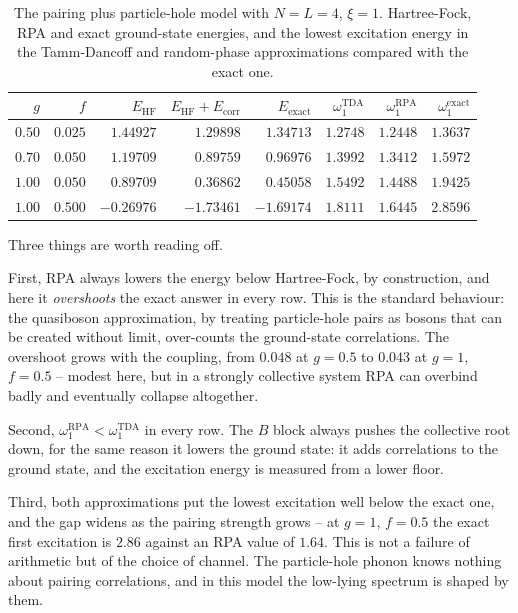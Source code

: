 \begin{table}[h]
\centering
\renewcommand{\arraystretch}{1.25}
\setlength{\tabcolsep}{7pt}
\begin{tabular}{rrrrrrrr}
\toprule
$g$ & $f$ & $E_{\mathrm{HF}}$
  & $E_{\mathrm{HF}}+E_{\mathrm{corr}}$ & $E_{\mathrm{exact}}$
  & $\omega_1^{\mathrm{TDA}}$ & $\omega_1^{\mathrm{RPA}}$
  & $\omega_1^{\mathrm{exact}}$\\
\midrule
$0.50$ & $0.025$ & $1.44927$ & $1.29898$ & $1.34713$
  & $1.2748$ & $1.2448$ & $1.3637$\\
$0.70$ & $0.050$ & $1.19709$ & $0.89759$ & $0.96976$
  & $1.3992$ & $1.3412$ & $1.5972$\\
$1.00$ & $0.050$ & $0.89709$ & $0.36862$ & $0.45058$
  & $1.5492$ & $1.4488$ & $1.9425$\\
$1.00$ & $0.500$ & $-0.26976$ & $-1.73461$ & $-1.69174$
  & $1.8111$ & $1.6445$ & $2.8596$\\
\bottomrule
\end{tabular}
\caption{The pairing plus particle-hole model with $N=L=4$, $\xi=1$.
Hartree-Fock, RPA and exact ground-state energies, and the lowest excitation
energy in the Tamm-Dancoff and random-phase approximations compared with the
exact one.}
\label{tab:phresults}
\end{table}

Three things are worth reading off.

First, RPA always lowers the energy below Hartree-Fock, by construction, and
here it \emph{overshoots} the exact answer in every row.  This is the standard
behaviour: the quasiboson approximation, by treating particle-hole pairs as
bosons that can be created without limit, over-counts the ground-state
correlations.  The overshoot grows with the coupling, from $0.048$ at $g=0.5$
to $0.043$ at $g=1$, $f=0.5$ -- modest here, but in a strongly collective
system RPA can overbind badly and eventually collapse altogether.

Second, $\omega_1^{\mathrm{RPA}}<\omega_1^{\mathrm{TDA}}$ in every row.  The
$B$ block always pushes the collective root down, for the same reason it
lowers the ground state: it adds correlations to the ground state, and the
excitation energy is measured from a lower floor.

Third, both approximations put the lowest excitation well below the exact
one, and the gap widens as the pairing strength grows -- at $g=1$, $f=0.5$
the exact first excitation is $2.86$ against an RPA value of $1.64$.  This is
not a failure of arithmetic but of the choice of channel.  The particle-hole
phonon knows nothing about pairing correlations, and in this model the
low-lying spectrum is shaped by them.


